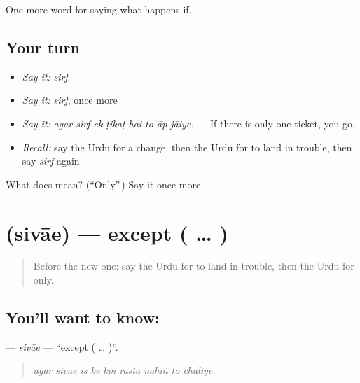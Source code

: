 \begin{grammarlens}[title={What you've built}]
One more word for saying what happens if.
\end{grammarlens}

\subsection*{Your turn}
\begin{itemize}
\raggedright
  \item \emph{Say it:} \emph{sirf}
  \item \emph{Say it:} \emph{sirf}, once more
  \item \emph{Say it:} \emph{agar sirf ek ṭikaṭ hai to āp jāiye.} — If there is only one ticket, you go.
  \item \emph{Recall:} say the Urdu for a change, then the Urdu for to land in trouble, then say \emph{sirf} again
\end{itemize}

\begin{tcolorbox}[breakable,colback=teal!4,colframe=teal!35!black,title={Before you move on}]
What does  mean? (\textquotedblleft{}Only\textquotedblright{}.) Say it once more.
\end{tcolorbox}
\section[\texorpdfstring{\ur{سوائے} (sivāe)}{سوائے (sivāe)}]{ (sivāe) — except ( … )}

\label{lesson:UR-C366-sivae}



\begin{quote}
Before the new one: say the Urdu for to land in trouble, then the Urdu for only.
\end{quote}

\subsection*{You'll want to know: }
\textbf{} — \emph{sivāe} — \textquotedblleft{}except ( … )\textquotedblright{}.

\begin{quote}
        
\end{quote}

\begin{quote}
\emph{agar sivāe is ke koī rāstā nahīṅ to chaliye.}
\end{quote}

